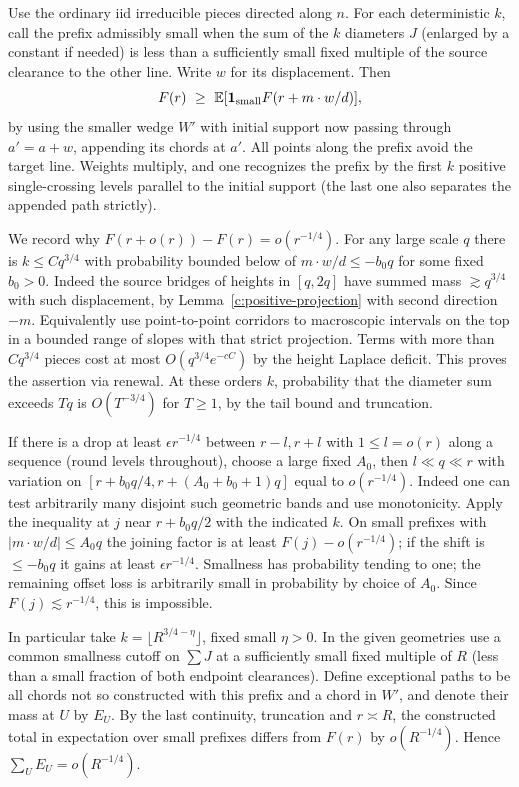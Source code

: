 Use the ordinary iid irreducible pieces directed along \(n\). For each deterministic \(k\), call the prefix admissibly small when the sum of the \(k\) diameters \(J\) (enlarged by a constant if needed) is less than a sufficiently small fixed multiple of the source clearance to the other line. Write \(w\) for its displacement. Then
\[
 F(r)\ \ge\ \mathbb E[{\bf1}_{\rm small} F(r+m\cdot w/d)],
\]
by using the smaller wedge \(W'\) with initial support now passing through \(a'=a+w\), appending its chords at \(a'\). All points along the prefix avoid the target line. Weights multiply, and one recognizes the prefix by the first \(k\) positive single-crossing levels parallel to the initial support (the last one also separates the appended path strictly).



We record why \(F(r+o(r))-F(r)=o(r^{-1/4})\). For any large scale \(q\) there is \(k\le C q^{3/4}\) with probability bounded below of \(m\cdot w/d\le -b_0 q\) for some fixed \(b_0>0\). Indeed the source bridges of heights in \([q,2q]\) have summed mass \(\gtrsim q^{3/4}\) with such displacement, by Lemma~\ref{c:positive-projection} with second direction \(-m\). Equivalently use point-to-point corridors to macroscopic intervals on the top in a bounded range of slopes with that strict projection. Terms with more than \(C q^{3/4}\) pieces cost at most \(O(q^{3/4}e^{-c C})\) by the height Laplace deficit. This proves the assertion via renewal. At these orders \(k\), probability that the diameter sum exceeds \(Tq\) is \(O(T^{-3/4})\) for \(T\ge1\), by the tail bound and truncation.



If there is a drop at least \(\epsilon r^{-1/4}\) between \(r-l,r+l\) with \(1\le l=o(r)\) along a sequence (round levels throughout), choose a large fixed \(A_0\), then \(l\ll q\ll r\) with variation on \([r+b_0 q/4,r+(A_0+b_0+1)q]\) equal to \(o(r^{-1/4})\). Indeed one can test arbitrarily many disjoint such geometric bands and use monotonicity. Apply the inequality at \(j\) near \(r+b_0 q/2\) with the indicated \(k\). On small prefixes with \(|m\cdot w/d|\le A_0 q\) the joining factor is at least \(F(j)-o(r^{-1/4})\); if the shift is \(\le-b_0 q\) it gains at least \(\epsilon r^{-1/4}\). Smallness has probability tending to one; the remaining offset loss is arbitrarily small in probability by choice of \(A_0\). Since \(F(j)\lesssim r^{-1/4}\), this is impossible.



In particular take \(k=\lfloor R^{3/4-\eta}\rfloor\), fixed small \(\eta>0\). In the given geometries use a common smallness cutoff on \(\sum J\) at a sufficiently small fixed multiple of \(R\) (less than a small fraction of both endpoint clearances). Define exceptional paths to be all chords not so constructed with this prefix and a chord in \(W'\), and denote their mass at \(U\) by \(E_U\). By the last continuity, truncation and \(r\asymp R\), the constructed total in expectation over small prefixes differs from \(F(r)\) by \(o(R^{-1/4})\). Hence \(\sum_U E_U=o(R^{-1/4})\).



